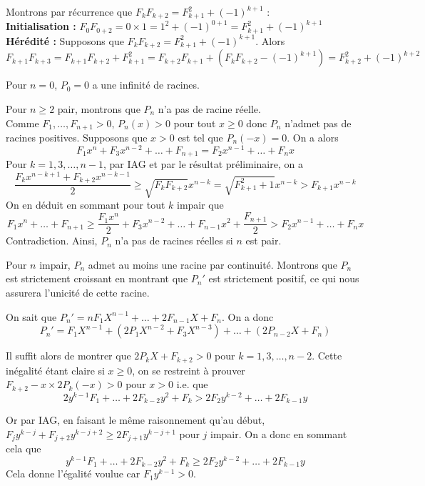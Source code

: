Montrons par récurrence que $F_kF_{k + 2} = F_{k + 1}^2 + (-1)^{k + 1}$ : \\
\textbf{Initialisation :} $F_0F_{0 + 2} = 0\times 1 = 1^2 + (-1)^{0 + 1} = F_{k + 1}^2 + (-1)^{k + 1} $ \\
\textbf{Hérédité :} Supposons que $F_kF_{k + 2} = F_{k + 1}^2 + (-1)^{k + 1}$. Alors
$$F_{k + 1}F_{k + 3} = F_{k + 1}F_{k + 2} + F_{k + 1}^2 = F_{k + 2}F_{k + 1} + (F_kF_{k + 2} - (-1)^{k + 1}) = F_{k + 2}^2 + (-1)^{k + 2}$$

Pour $n = 0$, $P_0 = 0$ a une infinité de racines.

Pour $n \ge 2$ pair, montrons que $P_n$ n'a pas de racine réelle. \\
Comme $F_1, \dots, F_{n + 1} > 0$, $P_n(x) > 0$ pour tout $x\ge 0$ donc $P_n$ n'admet pas de racines positives. Supposons que $x > 0$ est tel que $P_n(-x) = 0$. On a alors
$$F_1x^n + F_3x^{n - 2} + \dots + F_{n + 1} = F_2x^{n - 1} + \dots + F_nx$$
Pour $k = 1, 3, \dots, n - 1$, par IAG et par le résultat préliminaire, on a
$$\frac{F_kx^{n - k + 1} + F_{k + 2}x^{n - k - 1}}{2} \ge \sqrt{F_kF_{k + 2}}x^{n - k} = \sqrt{F_{k + 1}^2 + 1}x^{n - k} > F_{k + 1}x^{n - k}$$
On en déduit en sommant pour tout $k$ impair que
$$F_1x^n + \dots + F_{n + 1} \ge \frac{F_1x^n}{2} + F_3x^{n - 2} + \dots + F_{n - 1}x^2 + \frac{F_{n + 1}}{2} > F_2x^{n - 1} + \dots + F_nx$$
Contradiction. Ainsi, $P_n$ n'a pas de racines réelles si $n$ est pair.
\smallskip

Pour $n$ impair, $P_n$ admet au moins une racine par continuité. Montrons que $P_n$ est strictement croissant en montrant que $P_n'$ est strictement positif, ce qui nous assurera l'unicité de cette racine.

On sait que $P_n' = nF_1X^{n - 1} + \dots + 2F_{n - 1}X + F_n$. On a donc
$$P_n' = F_1X^{n - 1} + (2P_1X^{n - 2} + F_3X^{n - 3}) + \dots + (2P_{n - 2}X + F_n)$$

Il suffit alors de montrer que $2P_kX + F_{k + 2} > 0$ pour $k = 1, 3, \dots, n - 2$. Cette inégalité étant claire si $ x \ge 0$, on se restreint à prouver $F_{k + 2} - x\times 2P_k(-x) > 0$ pour $x > 0$ i.e. que
$$2y^{k-1}F_1+\dots +2F_{k-2}y^2+F_k>2F_2y^{k-2}+\dots + 2F_{k-1}y$$

Or par IAG, en faisant le même raisonnement qu'au début, $F_jy^{k-j}+F_{j+2}y^{k-j+2}\ge 2F_{j+1}y^{k-j+1}$ pour $j$ impair. On a donc en sommant cela que $$y^{k-1}F_1+\dots +2F_{k-2}y^2+F_k\ge 2F_2y^{k-2}+\dots + 2F_{k-1}y$$ Cela donne l'égalité voulue car $F_1y^{k-1}>0$.